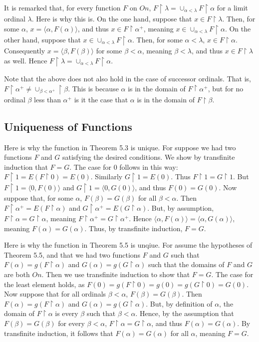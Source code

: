 \documentclass{article}
\theoremstyle{definition}
\begin{document}
It is remarked that, for every function $F$ on $On$, $F\restriction\lambda=\cup_{\alpha<\lambda}F\restriction\alpha$ for a limit ordinal $\lambda$. Here is why this 
is. On the one hand, suppose that $x\in F\restriction\lambda$. Then, for some $\alpha$, $x=\langle\alpha,F(\alpha)\rangle$, and thus 
$x\in F\restriction\alpha^+$, meaning $x\in\cup_{\alpha<\lambda}F\restriction\alpha$. On the other hand, suppose that
$x\in\cup_{\alpha<\lambda}F\restriction\alpha$. Then, for some $\alpha<\lambda$, $x\in F\restriction\alpha$. Consequently 
$x=\langle\beta,F(\beta)\rangle$ for some $\beta<\alpha$, meaning $\beta<\lambda$, and thus $x\in F\restriction\lambda$ as well. Hence 
$F\restriction\lambda=\cup_{\alpha<\lambda}F\restriction\alpha$. 

Note that the above does not also hold in the case of successor ordinals. That is, $F\restriction\alpha^+\ne\cup_{\beta<\alpha^+}\restriction\beta$. This is because 
$\alpha$ is in the domain of $F\restriction\alpha^+$, but for no ordinal $\beta$ less than $\alpha^+$ is it the case that $\alpha$ is in the domain of $F\restriction\beta$. 

\subsection*{Uniqueness of Functions}
Here is why the function in Theorem 5.3 is unique. For suppose we had two functions $F$ and $G$ satisfying the desired conditions. We show 
by transfinite induction that $F=G$. The case for 0 follows in this way: $F\restriction 1=E(F\restriction 0)=E(0)$. Similarly 
$G\restriction 1=E(0)$. Thus $F\restriction 1=G\restriction 1$. But $F\restriction 1=\langle 0,F(0)\rangle$ and 
$G\restriction 1=\langle 0,G(0)\rangle$, and thus $F(0)=G(0)$. Now suppose that, for some $\alpha$, $F(\beta)=G(\beta)$ for all 
$\beta<\alpha$. Then $F\restriction\alpha^+=E(F\restriction\alpha)$ and $G\restriction\alpha^+=E(G\restriction\alpha)$. But, by assumption, 
$F\restriction\alpha=G\restriction\alpha$, meaning $F\restriction\alpha^+=G\restriction\alpha^+$. Hence 
$\langle\alpha,F(\alpha)\rangle=\langle\alpha,G(\alpha)\rangle$, meaning $F(\alpha)=G(\alpha)$. Thus, by transfinite induction, 
$F=G$. 

Here is why the function in Theorem 5.5 is unqiue. For assume the hypotheses of Theorem 5.5, and that we had two functions $F$ and $G$ such that 
$F(\alpha)=g(F\restriction\alpha)$ and $G(\alpha)=g(G\restriction\alpha)$ such that the domains of $F$ and $G$ are both $On$. Then we use 
transfinite induction to show that $F=G$. The case for the least element holds, as $F(0)=g(F\restriction 0)=g(0)=g(G\restriction 0)=G(0)$.
Now suppose that for all ordinals $\beta<\alpha$, $F(\beta)=G(\beta)$. Then $F(\alpha)=g(F\restriction\alpha)$ and $G(\alpha)=g(G\restriction\alpha)$. 
But, by definition of $\alpha$, the domain of $F\restriction\alpha$ is every $\beta$ such that $\beta<\alpha$. 
Hence, by the assumption that $F(\beta)=G(\beta)$ for every $\beta<\alpha$, $F\restriction\alpha=G\restriction\alpha$, and 
thus $F(\alpha)=G(\alpha)$. By transfinite induction, it follows that $F(\alpha)=G(\alpha)$ for all $\alpha$, meaning $F=G$.
\end{document}
